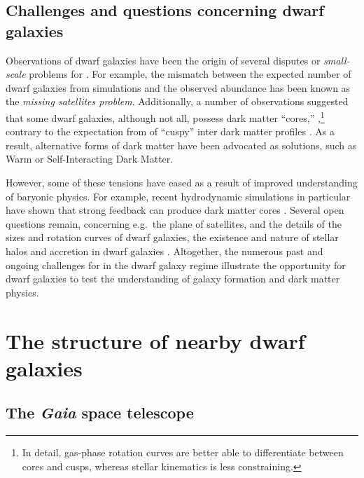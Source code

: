 \subsection{Challenges and questions concerning dwarf
galaxies}\label{challenges-and-questions-concerning-dwarf-galaxies}

Observations of dwarf galaxies have been the origin of several disputes
or \emph{small-scale} problems for \LCDM{} \citep[see reviews
by][]{bullock+boylan-kolchin2017, sales+2022}. For example, the mismatch
between the expected number of dwarf galaxies from simulations and the
observed abundance has been known as the \emph{missing satellites
problem}. Additionally, a number of observations suggested that some
dwarf galaxies, although not all, possess dark matter ``cores,''
\citep[e.g.,][]{moore1994, adams+2014, oh+2015, walker+penarrubia2011, read+walker+steger2019},\footnote{In
  detail, gas-phase rotation curves are better able to differentiate
  between cores and cusps, whereas stellar kinematics is less
  constraining.} contrary to the expectation from \LCDM{} of ``cuspy''
inter dark matter profiles \citep{NFW1996, NFW1997}. As a result,
alternative forms of dark matter have been advocated as solutions, such
as Warm or Self-Interacting Dark Matter.

However, some of these tensions have eased as a result of improved
understanding of baryonic physics. For example, recent hydrodynamic
simulations in particular have shown that strong feedback can produce
dark matter cores
\citetext{\citealp[e.g.,][\citet{tollet+2016}]{navarro+eke+frenk1996}; \citealp{fitts+2017}; \citealp{benitez-llambay+2019}; \citealp{orkney+2021}}.
Several open questions remain, concerning e.g.~the plane of satellites,
and the details of the sizes and rotation curves of dwarf galaxies, the
existence and nature of stellar halos and accretion in dwarf galaxies
\citep[e.g.,][]{sales+2022}. Altogether, the numerous past and ongoing
challenges for \LCDM{} in the dwarf galaxy regime illustrate the
opportunity for dwarf galaxies to test the understanding of galaxy
formation and dark matter physics.

\section{The structure of nearby dwarf
galaxies}\label{the-structure-of-nearby-dwarf-galaxies}

\subsection{\texorpdfstring{The \emph{Gaia} space
telescope}{The Gaia space telescope}}\label{the-gaia-space-telescope}

